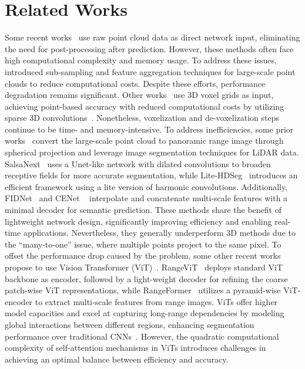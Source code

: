\section{Related Works}
\label{sec:related_works} 
 Some recent works~\cite{qi2017pointnet++, zhao2021point, wu2022ptv2} use raw point cloud data as direct network input, eliminating the need for post-processing after prediction. However, these methods often face high computational complexity and memory usage. To address these issues, \citet{hu2020randla} introduced sub-sampling and feature aggregation techniques for large-scale point clouds to reduce computational costs. Despite these efforts, performance degradation remains significant. Other works~\cite{zhou2020cylinder3d, lai2023spherical} use 3D voxel grids as input, achieving point-based accuracy with reduced computational costs by utilizing sparse 3D convolutions~\cite{choy2019minkowski}. Nonetheless, voxelization and de-voxelization steps continue to be time- and memory-intensive.
 To address inefficiencies, some prior works~\cite{wu2018squeezeseg, 2019rangenet++, wu2019squeezesegv2} convert the large-scale point cloud to panoramic range image through spherical projection and leverage image segmentation techniques for LiDAR data. SalsaNext~\cite{cortinhal2020salsanext} uses a Unet-like network with dilated convolutions to broaden receptive fields for more accurate segmentation, while Lite-HDSeg~\cite{razani2021lite} introduces an efficient framework using a lite version of harmonic convolutions. Additionally, FIDNet~\cite{zhao2021fidnet} and CENet ~\cite{cheng2022cenet} interpolate and concatenate multi-scale features with a minimal decoder for semantic prediction. These methods share the benefit of lightweight network design, significantly improving efficiency and enabling real-time applications. Nevertheless, they generally underperform 3D methods due to the “many-to-one” issue, where multiple points project to the same pixel. To offset the performance drop caused by the problem, some other recent works propose to use Vision Transformer (ViT)~\cite{dosovitskiy2020image, xie2021segformer, wang2021pyramid}. RangeViT~\cite{ando2023rangevit} deploys standard ViT backbone as encoder, followed by a light-weight decoder for refining the coarse patch-wise ViT representations, while RangeFormer~\cite{kong2023rethinking} utilizes a pyramid-wise ViT-encoder to extract multi-scale features from range images. ViTs offer higher model capacities and excel at capturing long-range dependencies by modeling global interactions between different regions, enhancing segmentation performance over traditional CNNs~\cite{deininger2022comparative}. However, the quadratic computational complexity of self-attention mechanisms in ViTs introduces challenges in achieving an optimal balance between efficiency and accuracy.
